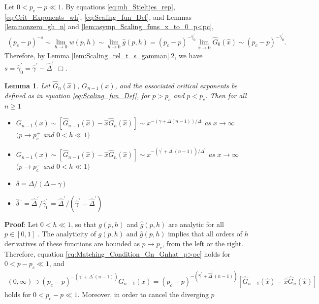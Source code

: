 \documentclass[english,12pt,jmp,graphicx]{revtex4-1}
\newtheorem{lemma}{Lemma}[section]
\newcommand{\gh}{\hat{\gamma}}
\newcommand{\Dh}{\hat{\Delta}}
\newcommand{\dha}{\hat{\delta}}
\newcommand{\xh}{\hat{x}}
\begin{document}
Let $0<p_c-p\ll1$. By equations \eqref{eq:mh_Stieltjes_rep},
\eqref{eq:Crit_Exponents_wh}, \eqref{eq:Scaling_fun_Def}, and Lemmas
\ref{lem:nonzero_gh_n} and \ref{lem:asymp_Scaling_funs_x_to_0_p<pc},
%
\begin{align*}
  (p_c-p)^{-s}\sim\lim_{h\to0}w(p,h)
           \sim\lim_{h\to0}\hat{g}(p,h)
           =(p_c-p)^{-\gh_0^\prime}\lim_{\xh\to0}\hat{G}_0(\xh)
           \sim(p_c-p)^{-\gh_0^\prime}. 
\end{align*}
%
Therefore, by Lemma \ref{lem:Scaling_rel_t_s_gamman}.2, we have
$s=\gh_0^\prime=\gh^\prime-\Dh^\prime$ $\Box$. 
%
 \begin{lemma}\label{lem:G_ghat_asymp_x_to_infty}
   Let $\hat{G}_n(\xh)$, $G_{n-1}(x)$, and the associated critical
   exponents be defined as in equation \eqref{eq:Scaling_fun_Def}, for
   $p>p_c$ and $p<p_c$. Then for all $n\geq1$ 
     \begin{itemize}
    \item[1)] $G_{n-1}(x)\sim[\hat{G}_{n-1}(\xh)-\xh\hat{G}_n(\xh)]\sim
      x^{-(\gamma+\Delta(n-1))/\Delta}$ as $x\to\infty$ $(p\to p_c^+$ and 
      $0<h\ll1)$
    \item[2)] $G_{n-1}(x)\sim[\hat{G}_{n-1}(\xh)-\xh\hat{G}_n(\xh)]\sim
      x^{-(\gamma^\prime+\Delta^\prime(n-1))/\Delta^\prime}$ as $x\to\infty$ $(p\to p_c^-$ and $0<h\ll1)$           
    \item[3)] $\delta=\Delta/(\Delta-\gamma)$
    \item[4)] $\dha\,^\prime=\Dh^\prime/\gh_0^\prime=\Dh^\prime/(\gh^\prime-\Dh^\prime)$  
     \end{itemize}
 \end{lemma}
%
\noindent \textbf{Proof}:
%
Let $0<h\ll1$, so that $g(p,h)$ and $\hat{g}(p,h)$ are analytic for
all $p\in[0,1]$ \cite{Golden:CMP-473}. The analyticity of $g(p,h)$ and
$\hat{g}(p,h)$ implies that all orders of $h$ derivatives of these
functions are bounded as $p\to p_c$, from the left or the
right. Therefore, equation \eqref{eq:Matching_Condition_Gn_Gnhat_p>pc}
holds for $0<p-p_c\ll1$, and 
%
\begin{align}\label{eq:x_infty_p<pc}
  (0,\infty)\ni(p_c-p)^{-(\gamma^\prime+\Delta^\prime(n-1))}G_{n-1}(x)
       =(p_c-p)^{-(\gh^\prime+\Dh^\prime(n-1))}[\hat{G}_{n-1}(\xh)-\xh\hat{G}_n(\xh)]
\end{align}
%
holds for $0<p_c-p\ll1$. Moreover, in order to cancel the diverging $p$
\end{document}
